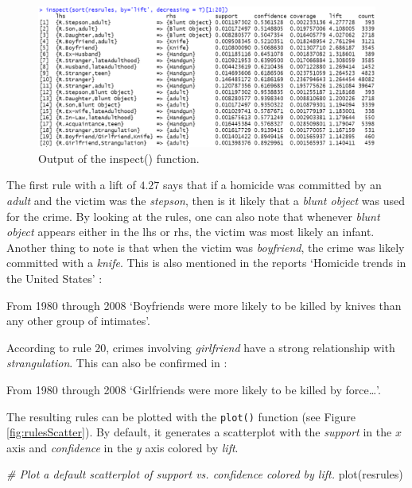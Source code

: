 \documentclass[
  11pt,
]{krantz}
\newenvironment{Shaded}{\begin{snugshade}}{\end{snugshade}}
\newcommand{\CommentTok}[1]{\textcolor[rgb]{0.37,0.37,0.37}{\textit{#1}}}
\newcommand{\FunctionTok}[1]{\textcolor[rgb]{0,0,0}{#1}}
\newcommand{\NormalTok}[1]{#1}
\renewenvironment{quote}{\begin{VF}}{\end{VF}}
\begin{document}
\begin{figure}

{\centering \includegraphics[width=1\linewidth]{images/resrules} 

}

\caption{Output of the inspect() function.}\label{fig:resrules}
\end{figure}

The first rule with a lift of \(4.27\) says that if a homicide was committed by an \emph{adult} and the victim was the \emph{stepson}, then is it likely that a \emph{blunt object} was used for the crime. By looking at the rules, one can also note that whenever \emph{blunt object} appears either in the lhs or rhs, the victim was most likely an infant. Another thing to note is that when the victim was \emph{boyfriend}, the crime was likely committed with a \emph{knife}. This is also mentioned in the reports `Homicide trends in the United States' \citep{cooper2012}:

\begin{quote}
From 1980 through 2008 `Boyfriends were more likely to be killed by knives than any other group of intimates'.
\end{quote}

According to rule \(20\), crimes involving \emph{girlfriend} have a strong relationship with \emph{strangulation}. This can also be confirmed in \citep{cooper2012}:

\begin{quote}
From 1980 through 2008 `Girlfriends were more likely to be killed by force\ldots{}'.
\end{quote}

The resulting rules can be plotted with the \texttt{plot()} function (see Figure \ref{fig:rulesScatter}). By default, it generates a scatterplot with the \emph{support} in the \(x\) axis and \emph{confidence} in the \(y\) axis colored by \emph{lift}.

\begin{Shaded}
\begin{Highlighting}[]
\CommentTok{\# Plot a default scatterplot of support vs. confidence colored by lift.}
\FunctionTok{plot}\NormalTok{(resrules)}
\end{Highlighting}
\end{Shaded}
\end{document}
